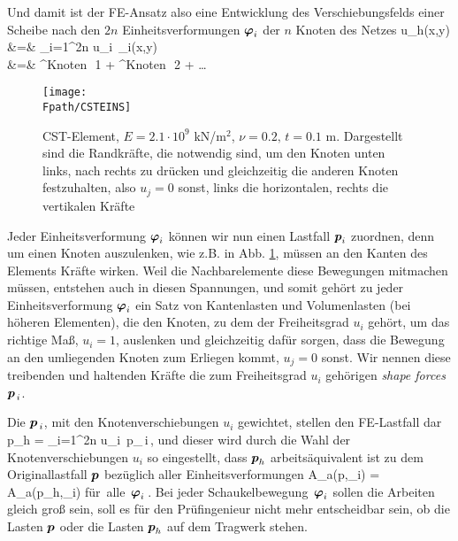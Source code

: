 {Und damit ist der FE-Ansatz also eine Entwicklung des Verschiebungsfelds einer Scheibe nach den $2n$
Einheitsverformungen $\mbox{\boldmath $\varphi$}_i$ der $n$ Knoten des Netzes
\bfo
\vek u_{h}(x,y) &=& \sum_{i=1}^{2n} u_i \,\vek \Np_i(x,y)\nn \\
&=& ^{Knoten \,\,1} + ^{Knoten \,\,2} + \ldots
\efo
\begin{figure}[tbp] \centering
\if {} \sidecaption \fi
\texttt{[image: \\Fpath/CSTEINS]}
\caption{CST-Element, $E = 2.1 \cdot 10^9$ kN/m$^2$, $\nu = 0.2,\, t = 0.1$ m.
Dargestellt sind die Randkr\"{a}fte, die notwendig sind, um den Knoten unten links, nach
rechts zu dr\"{u}cken und gleichzeitig die anderen Knoten festzuhalten, also $u_j = 0$ sonst, links die horizontalen, rechts die vertikalen Kr\"{a}fte}
\label{Elementkraefte}
\end{figure}%
Jeder Einheitsverformung $\mbox{\boldmath $\varphi$}_i$ k\"{o}nnen wir nun einen Lastfall $\mbox{\boldmath $p$}_i$ zuordnen, denn um einen Knoten auszulenken, wie z.B. in Abb. \ref{Elementkraefte}, m\"{u}ssen an den Kanten des Elements Kr\"{a}fte wirken. Weil die Nachbarelemente diese Bewegungen mitmachen m\"{u}ssen, entstehen auch in diesen Spannungen, und somit geh\"{o}rt zu jeder Einheitsverformung $\mbox{\boldmath $\varphi$}_i$ ein Satz von Kantenlasten und Volumenlasten (bei h\"{o}heren Elementen), die den Knoten, zu dem der Freiheitsgrad $u_i$ geh\"{o}rt, um das richtige Ma{\ss}, $u_i = 1$, auslenken und gleichzeitig daf\"{u}r sorgen, dass die Bewegung an den umliegenden Knoten zum Erliegen kommt, $u_j = 0$ sonst. Wir nennen diese treibenden und haltenden Kr\"{a}fte die zum Freiheitsgrad $u_i$ geh\"{o}rigen {\em shape forces\/} $\mbox{\boldmath $p$}_{\,i}$.

Die $\mbox{\boldmath $p$}_{\,i}$, mit den Knotenverschiebungen $u_i$ gewichtet, stellen den FE-Lastfall dar
\bfo
\vek p_{h} = \sum_{i=1}^{2n} u_i \,\vek p_{\,i}\,,
\efo
und dieser wird durch die Wahl der Knotenverschiebungen $u_i$ so eingestellt,
dass $\mbox{\boldmath $p$}_h$ arbeits\"{a}quivalent ist zu dem Originallastfall $\mbox{\boldmath $p$}$ bez\"{u}glich aller
Einheitsverformungen
\bfo
\delta A_a(\vek p,\vek \Np_i) = \delta A_a(\vek p_h,\vek \Np_i) \qquad \mbox{f\"{u}r alle
$\mbox{\boldmath $\varphi$}_i$}\,.
\efo
Bei jeder \glq Schaukelbewegung\grq\ $\mbox{\boldmath $\varphi$}_i$ sollen die Arbeiten gleich gro{\ss} sein, soll es f\"{u}r den Pr\"{u}fingenieur nicht mehr entscheidbar sein, ob die Lasten $\mbox{\boldmath $p$}$ oder die Lasten $\mbox{\boldmath $p$}_h$ auf dem Tragwerk stehen.

}
